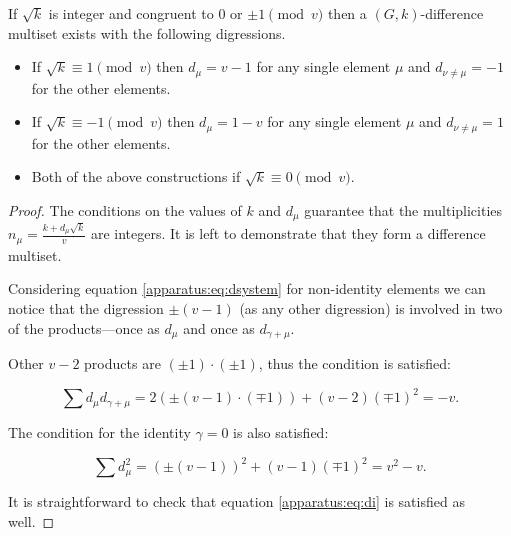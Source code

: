 \begin{theorem}
	\label{regular:theorem:regular}
	If $\sqrt k$ is integer and congruent to $0$ or $\pm 1 \pmod v$ then a $(G,k)$-difference multiset exists with the following digressions.
		\begin{itemize}
			\item If $\sqrt k \equiv 1 \pmod v$ then $d_\mu = v-1$ for any single element $\mu$ and $d_{\nu \neq \mu} = -1$ for the other elements.
			\item If $\sqrt k \equiv -1 \pmod v$ then $d_\mu =1-v$ for any single element $\mu$ and $d_{\nu \neq \mu} = 1$ for the other elements.
			\item Both of the above constructions if $\sqrt k \equiv 0 \pmod v$.
		\end{itemize}
\end{theorem}

\begin{proof}
	The conditions on the values of $k$ and $d_\mu$ guarantee that the multiplicities $n_\mu=\frac{k+d_\mu \sqrt k}v$ are integers. It is left to demonstrate that they form a difference multiset.
	
	Considering equation \eqref{apparatus:eq:dsystem} for non-identity elements we can notice that the digression $\pm(v-1)$ (as any other digression) is involved in two of the products---once as $d_\mu$ and once as $d_{\gamma+\mu}$.

	Other $v-2$ products are $(\pm1)\cdot(\pm1)$, thus the condition is satisfied:
	
	\begin{equation}
		\sum d_\mu d_{\gamma+\mu} = 2(\pm(v-1)\cdot(\mp 1)) + (v-2)(\mp1)^2 = -v.
	\end{equation}

	The condition for the identity $\gamma=0$ is also satisfied:
	
	\begin{equation}
		\sum d_\mu^2  = \left( \pm (v-1) \right)^2 + (v-1) \left( \mp 1 \right)^2 = v^2 - v.
	\end{equation}

	It is straightforward to check that equation \eqref{apparatus:eq:di} is satisfied as well.
\end{proof}
